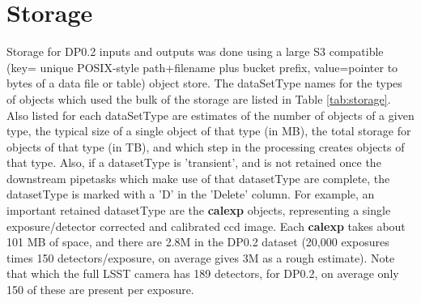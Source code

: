 \documentclass[OPS,authoryear,toc]{lsstdoc}
\begin{document}
\section{Storage}

Storage for DP0.2 inputs and outputs was done using a large S3 compatible
(key= unique POSIX-style path+filename plus bucket prefix, value=pointer
to bytes of a data file or table) object store.   The dataSetType names for
the types of objects which used the bulk of the storage are listed in
Table \ref{tab:storage}.  Also listed
for each dataSetType are estimates of the number of objects of a given type,
the typical size of a single object of that type (in MB), the total
storage for objects of that type (in TB), and which step in the processing
creates objects of that type.  Also, if a datasetType is 'transient', and 
is not retained once the downstream pipetasks which make use of that
datasetType are complete, the datasetType is marked with a 'D' in the 'Delete'
column.  For example, an important retained datasetType are the {\bf calexp} objects, representing a single exposure/detector corrected and calibrated
ccd image.  Each {\bf calexp} takes about 101 MB of space, and there are 2.8M 
in the DP0.2 dataset (20,000 exposures times 150 detectors/exposure, on average gives 3M as a rough estimate).  Note that which the full LSST camera has 189
detectors, for DP0.2, on average only 150 of these are present per exposure.
\end{document}
